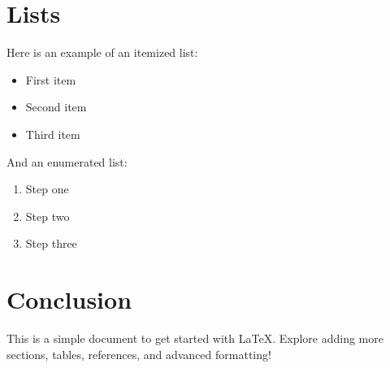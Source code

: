 \documentclass[12pt, a4paper]{article}
\begin{document}
\section{Lists}
Here is an example of an itemized list:
\begin{itemize}
	\item First item
	\item Second item
	\item Third item
\end{itemize}

And an enumerated list:
\begin{enumerate}
	\item Step one
	\item Step two
	\item Step three
\end{enumerate}

\section{Conclusion}
This is a simple document to get started with LaTeX. Explore adding more sections, tables, references, and advanced formatting!

\end{document}
